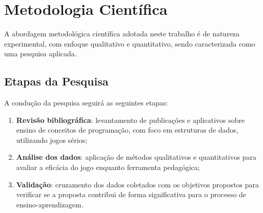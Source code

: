 \section{Metodologia Científica}

A abordagem metodológica científica adotada neste trabalho é de natureza experimental, com enfoque qualitativo e quantitativo, sendo caracterizada como uma pesquisa aplicada.

\subsection{Etapas da Pesquisa}

A condução da pesquisa seguirá as seguintes etapas:

\begin{enumerate}
  \item \textbf{Revisão bibliográfica}: levantamento de publicações e aplicativos sobre ensino de conceitos de programação, com foco em estruturas de dados, utilizando jogos sérios;
  \item \textbf{Análise dos dados}: aplicação de métodos qualitativos e quantitativos para avaliar a eficácia do jogo enquanto ferramenta pedagógica;
  \item \textbf{Validação}: cruzamento dos dados coletados com os objetivos propostos para verificar se a proposta contribui de forma significativa para o processo de ensino-aprendizagem.
\end{enumerate}
